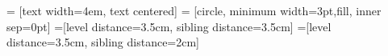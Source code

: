 \renewcommand{\typeRubriek}{loep}		

 = [text width=4em, text centered]
 = [circle, minimum width=3pt,fill, inner sep=0pt]
=[level distance=3.5cm, sibling distance=3.5cm]
=[level distance=3.5cm, sibling distance=2cm]


	




